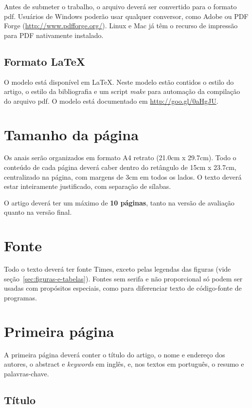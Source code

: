 \documentclass[12pt]{article}
\begin{document}
Antes de submeter o trabalho, o arquivo deverá ser convertido para o
formato pdf. Usuários de Windows poderão usar qualquer conversor, como
Adobe ou PDF Forge (\url{http://www.pdfforge.org/}). Linux e Mac já
têm o recurso de impressão para PDF nativamente instalado.

\subsection{Formato \LaTeX}
\label{sec:latex}

O modelo está disponível em \LaTeX{}. Neste modelo estão contidos o
estilo do artigo, o estilo da bibliografia e um script \textit{make}
para automação da compilação do arquivo pdf. O modelo está documentado
em \url{http://goo.gl/0aHgJU}.

\section{Tamanho da página}
\label{sec:tamanho-pagina}

Os anais serão organizados em formato A4 retrato (21.0cm x 29.7cm).
Todo o conteúdo de cada página deverá caber dentro do retângulo de
15cm x 23.7cm, centralizado na página, com margens de 3cm em todos os
lados. O texto deverá estar inteiramente justificado, com separação de
sílabas.

O artigo deverá ter um máximo de \textbf{10 páginas}, tanto na versão
de avaliação quanto na versão final.

\section{Fonte}
\label{sec:fonte}

Todo o texto deverá ter fonte Times, exceto pelas legendas das figuras
(vide seção~\ref{sec:figuras-e-tabelas}). Fontes sem serifa e não
proporcional só podem ser usadas com propósitos especiais, como para
diferenciar texto de código-fonte de programas.

\section{Primeira página}

A primeira página deverá conter o título do artigo, o nome e endereço
dos autores, o abstract e \textit{keywords} em inglês, e, nos textos
em português, o resumo e palavras-chave.

\subsection{Título}
\label{sec:titulo}
\end{document}
